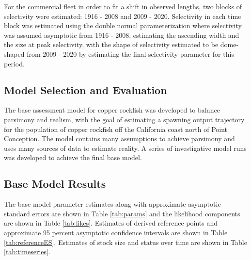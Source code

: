 \documentclass[11pt,
  english,
  a4paper,
]{article}
\begin{document}
For the commercial fleet in order to fit a shift in observed lengths, two blocks of selectivity were estimated: 1916 - 2008 and 2009 - 2020. Selectivity in each time block was estimated using the double normal parameterization where selectivity was assumed asymptotic from 1916 - 2008, estimating the ascending width and the size at peak selectivity, with the shape of selectivity estimated to be dome-shaped from 2009 - 2020 by estimating the final selectivity parameter for this period.

\leavevmode\tagmcend\tagstructend\par


\hypertarget{model-selection-and-evaluation}{%
\subsection{Model Selection and Evaluation}\label{model-selection-and-evaluation}}

\leavevmode\tagmcend\tagstructend


The base assessment model for copper rockfish was developed to balance parsimony and realism, with the goal of estimating a spawning output trajectory for the population of copper rockfish off the California coast north of Point Conception. The model contains many assumptions to achieve parsimony and uses many sources of data to estimate reality. A series of investigative model runs was developed to achieve the final base model.

\leavevmode\tagmcend\tagstructend\par


\hypertarget{base-model-results}{%
\subsection{Base Model Results}\label{base-model-results}}

\leavevmode\tagmcend\tagstructend


The base model parameter estimates along with approximate asymptotic standard errors are shown in Table \ref{tab:params} and the likelihood components are shown in Table \ref{tab:likes}. Estimates of derived reference points and approximate 95 percent asymptotic confidence intervals are shown in Table \ref{tab:referenceES}. Estimates of stock size and status over time are shown in Table \ref{tab:timeseries}.
\end{document}

